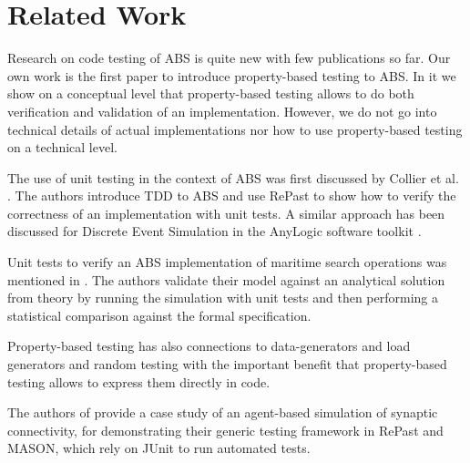 \section{Related Work}
\label{sec:related}
Research on code testing of ABS is quite new with few publications so far. Our own work \cite{thaler_show_2019} is the first paper to introduce property-based testing to ABS. In it we show on a conceptual level that property-based testing allows to do both verification and validation of an implementation. However, we do not go into technical details of actual implementations nor how to use property-based testing on a technical level.

The use of unit testing in the context of ABS was first discussed by Collier et al. \cite{collier_test-driven_2013}. The authors introduce TDD to ABS and use RePast to show how to verify the correctness of an implementation with unit tests. A similar approach has been discussed for Discrete Event Simulation in the AnyLogic software toolkit \cite{asta_investigation_2014}. 

Unit tests to verify an ABS implementation of maritime search operations was mentioned in \cite{onggo_test-driven_2016}. The authors validate their model against an analytical solution from theory by running the simulation with unit tests and then performing a statistical comparison against the formal specification.

Property-based testing has also connections to data-generators \cite{gurcan_generic_2013} and load generators and random testing \cite{burnstein_practical_2010} with the important benefit that property-based testing allows to express them directly in code.

The authors of \cite{gurcan_generic_2013} provide a case study of an agent-based simulation of synaptic connectivity, for demonstrating their generic testing framework in RePast and MASON, which rely on JUnit to run automated tests.